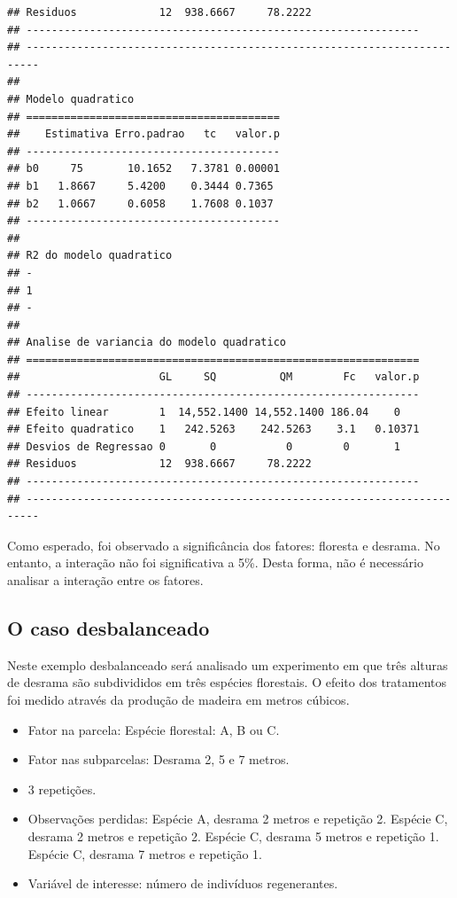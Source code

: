 \documentclass[
]{article}
\providecommand{\tightlist}{%
  \setlength{\itemsep}{0pt}\setlength{\parskip}{0pt}}
\begin{document}
\begin{verbatim}
## Residuos             12  938.6667     78.2222                 
## --------------------------------------------------------------
## ------------------------------------------------------------------------
## 
## Modelo quadratico
## ========================================
##    Estimativa Erro.padrao   tc   valor.p
## ----------------------------------------
## b0     75       10.1652   7.3781 0.00001
## b1   1.8667     5.4200    0.3444 0.7365 
## b2   1.0667     0.6058    1.7608 0.1037 
## ----------------------------------------
## 
## R2 do modelo quadratico
## -
## 1
## -
## 
## Analise de variancia do modelo quadratico
## ==============================================================
##                      GL     SQ          QM        Fc   valor.p
## --------------------------------------------------------------
## Efeito linear        1  14,552.1400 14,552.1400 186.04    0   
## Efeito quadratico    1   242.5263    242.5263    3.1   0.10371
## Desvios de Regressao 0       0           0        0       1   
## Residuos             12  938.6667     78.2222                 
## --------------------------------------------------------------
## ------------------------------------------------------------------------
\end{verbatim}

Como esperado, foi observado a significância dos fatores: floresta e desrama. No entanto, a interação não foi significativa a 5\%. Desta forma, não é necessário analisar a interação entre os fatores.

\hypertarget{o-caso-desbalanceado-4}{%
\subsection{O caso desbalanceado}\label{o-caso-desbalanceado-4}}

Neste exemplo desbalanceado será analisado um experimento em que três alturas de desrama são subdivididos em três espécies florestais. O efeito dos tratamentos foi medido através da produção de madeira em metros cúbicos.

\begin{itemize}
\tightlist
\item
  Fator na parcela: Espécie florestal: A, B ou C.
\item
  Fator nas subparcelas: Desrama 2, 5 e 7 metros.
\item
  3 repetições.
\item
  Observações perdidas: Espécie A, desrama 2 metros e repetição 2. Espécie C, desrama 2 metros e repetição 2. Espécie C, desrama 5 metros e repetição 1. Espécie C, desrama 7 metros e repetição 1.
\item
  Variável de interesse: número de indivíduos regenerantes.
\end{itemize}
\end{document}
